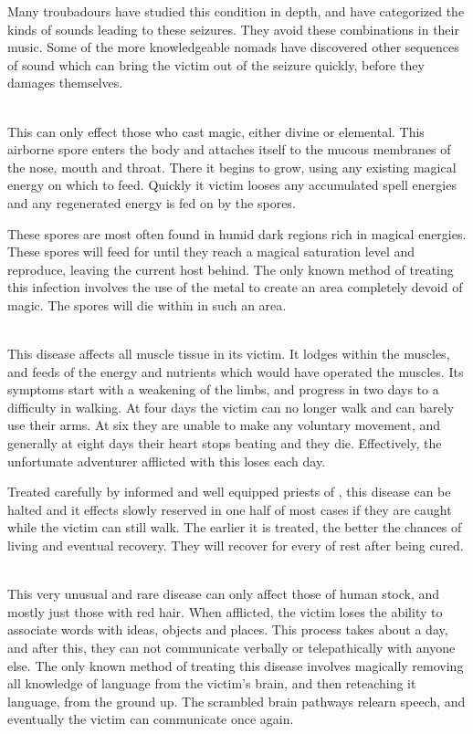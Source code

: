 \begin{multicols}{2}
Many troubadours have studied this condition in depth, and have categorized the kinds of sounds leading to these seizures. They avoid these combinations in their music. Some of the more knowledgeable nomads have discovered other sequences of sound which can bring the victim out of the seizure quickly, before they damages themselves.

\\
This can only effect those who cast magic, either divine or elemental. This airborne spore enters the body and attaches itself to the mucous membranes of the nose, mouth and throat. There it begins to grow, using any existing magical energy on which to feed. Quickly it victim looses any accumulated spell energies and any regenerated energy is fed on by the spores.

These spores are most often found in humid dark regions rich in magical energies. These spores will feed for  until they reach a magical saturation level and reproduce, leaving the current host behind. The only known method of treating this infection involves the use of the metal  to create an area completely devoid of magic. The spores will die within  in such an area.

\\
This disease affects all muscle tissue in its victim. It lodges within the muscles, and feeds of the energy and nutrients which would have operated the muscles. Its symptoms start with a weakening of the limbs, and progress in two days to a difficulty in walking. At four days the victim can no longer walk and can barely use their arms. At six they are unable to make any voluntary movement, and generally at eight days their heart stops beating and they die. Effectively, the unfortunate adventurer afflicted with this loses \tcdefine{2 \STR} each day.

Treated carefully by informed and well equipped priests of , this disease can be halted and it effects slowly reserved in one half of most cases if they are caught while the victim can still walk. The earlier it is treated, the better the chances of living and eventual recovery. They will recover \tcdefine{1 \STR} for every  of rest after being cured.

\\
This very unusual and rare disease can only affect those of human stock, and mostly just those with red hair. When afflicted, the victim loses the ability to associate words with ideas, objects and places. This process takes about a day, and after this, they can not communicate verbally or telepathically with anyone else. The only known method of treating this disease involves magically removing all knowledge of language from the victim's brain, and then reteaching it language, from the ground up. The scrambled brain pathways relearn speech, and eventually the victim can communicate once again.
\end{multicols}